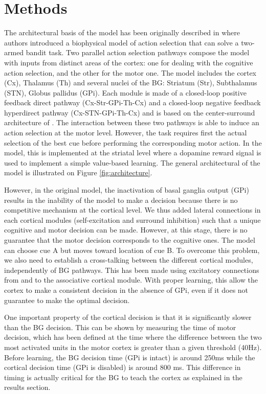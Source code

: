 \section{Methods}

The architectural basis of the model has been originally described in
\citet{Guthrie:2013} where authors introduced a biophysical model of action
selection that can solve a two-armed bandit task. Two parallel action selection
pathways compose the model with inputs from distinct areas of the cortex: one
for dealing with the cognitive action selection, and the other for the motor
one. The model includes the cortex (Cx), Thalamus (Th) and several nuclei of
the BG: Striatum (Str), Subthalamus (STN), Globus pallidus (GPi). Each module
is made of a closed-loop positive feedback direct pathway (Cx-Str-GPi-Th-Cx)
and a closed-loop negative feedback hyperdirect pathway (Cx-STN-GPi-Th-Cx) and
is based on the center-surround architecture of \cite{Mink:1996}. The
interaction between these two pathways is able to induce an action selection at
the motor level. However, the task requires first the actual selection of the
best cue before performing the corresponding motor action. In the
\citet{Guthrie:2013} model, this is implemented at the striatal level where a
dopamine reward signal is used to implement a simple value-based learning. The
general architectural of the model is illustrated on Figure \ref{fig:architecture}.

However, in the original model, the inactivation of basal ganglia output (GPi)
results in the inability of the model to make a decision because there is no
competitive mechanism at the cortical level. We thus added lateral connections
in each cortical modules (self-excitation and surround inhibition) such that a
unique cognitive and motor decision can be made. However, at this stage, there
is no guarantee that the motor decision corresponds to the cognitive ones. The
model can choose cue A but moves toward location of cue B. To overcome this
problem, we also need to establish a cross-talking between the different
cortical modules, independently of BG pathways. This has been made using
excitatory connections from and to the associative cortical module. With proper
learning, this allow the cortex to make a consistent decision in the absence of
GPi, even if it does not guarantee to make the optimal decision.

One important property of the cortical decision is that it is significantly
slower than the BG decision. This can be shown by measuring the time of motor
decision, which has been defined at the time where the difference between the
two most activated units in the motor cortex is greater than a given threshold
(40Hz). Before learning, the BG decision time (GPi is intact) is around 250ms
while the cortical decision time (GPi is disabled) is around 800 ms. This
difference in timing is actually critical for the BG to teach the cortex as
explained in the results section.

